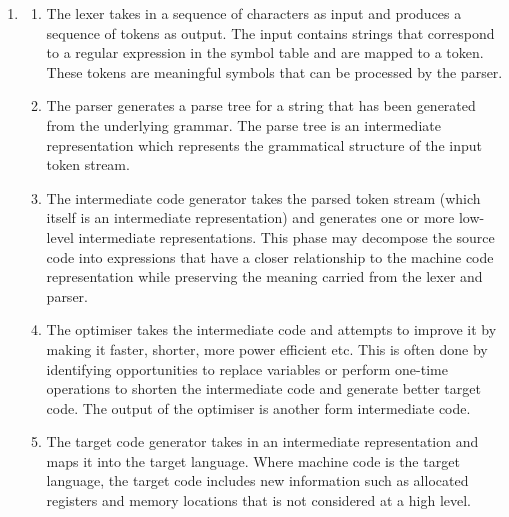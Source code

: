 \documentclass[a4paper, 12pt, oneside]{book}
\begin{document}
\begin{enumerate}
  \item
    \begin{enumerate}
      \item
        The lexer takes in a sequence of characters as input and produces a sequence of tokens as output. The input contains strings that correspond to a regular expression in the symbol table and are mapped to a token. These tokens are meaningful symbols that can be processed by the parser.
      \item
        The parser generates a parse tree for a string that has been generated from the underlying grammar. The parse tree is an intermediate representation which represents the grammatical structure of the input token stream.
      \item
        The intermediate code generator takes the parsed token stream (which itself is an intermediate representation) and generates one or more low-level intermediate representations. This phase may decompose the source code into expressions that have a closer relationship to the machine code representation while preserving the meaning carried from the lexer and parser.

      \item
        The optimiser takes the intermediate code and attempts to improve it by making it faster, shorter, more power efficient etc. This is often done by identifying opportunities to replace variables or perform one-time operations to shorten the intermediate code and generate better target code. The output of the optimiser is another form intermediate code.

      \item
        The target code generator takes in an intermediate representation and maps it into the target language. Where machine code is the target language, the target code includes new information such as allocated registers and memory locations that is not considered at a high level.\\
    \end{enumerate}


\end{enumerate}
\end{document}
